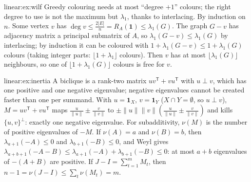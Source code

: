 \begin{solution}{linear:ex:wilf}
\idea Greedy colouring needs at most ``degree $+1$'' colours; the right degree to use is not the maximum but $\lambda_1$, thanks to
interlacing.
\writeup By induction on $n$. Some vertex $v$ has $\deg v\le\frac{2|E|}n=R_A(\mathbf 1)\le\lambda_1(G)$. The graph $G-v$ has adjacency
matrix a principal submatrix of $A$, so $\lambda_1(G-v)\le\lambda_1(G)$ by interlacing; by induction it can be coloured with
$1+\lambda_1(G-v)\le1+\lambda_1(G)$ colours (taking integer parts: $\lfloor1+\lambda_1\rfloor$ colours). Then $v$ has at most
$\lfloor\lambda_1(G)\rfloor$ neighbours, so one of $\lfloor1+\lambda_1(G)\rfloor$ colours is free for $v$.
\end{solution}

\begin{solution}{linear:ex:inertia}
\idea A biclique is a rank-two matrix $uv^{\mathsf T}+vu^{\mathsf T}$ with $u\perp v$, which has one positive and one negative eigenvalue;
negative eigenvalues cannot be created faster than one per summand.
\writeup With $u=\mathbf 1_X$, $v=\mathbf 1_Y$ ($X\cap Y=\emptyset$, so $u\perp v$), $M=uv^{\mathsf T}+vu^{\mathsf T}$ maps $\frac u{\|u\|}\pm
\frac v{\|v\|}$ to $\pm\|u\|\|v\|(\frac u{\|u\|}\pm\frac v{\|v\|})$ and kills $\{u,v\}^\perp$: exactly one negative eigenvalue. For
subadditivity, $\nu(M)$ is the number of positive eigenvalues of $-M$. If $\nu(A)=a$ and $\nu(B)=b$, then $\lambda_{a+1}(-A)\le0$ and
$\lambda_{b+1}(-B)\le0$, and Weyl gives $\lambda_{a+b+1}(-A-B)\le\lambda_{a+1}(-A)+\lambda_{b+1}(-B)\le0$: at most $a+b$ eigenvalues of
$-(A+B)$ are positive. If $J-I=\sum_{t=1}^mM_t$, then $n-1=\nu(J-I)\le\sum_t\nu(M_t)=m$.
\end{solution}

